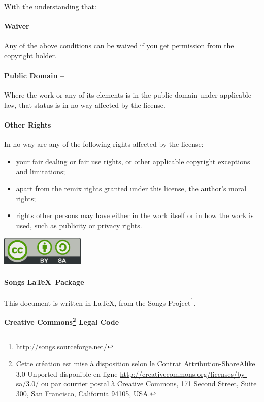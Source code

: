 {\begin{lblock}{With the understanding that:}
    \hspace{0.4cm}
    \parbox{15cm}{
      \paragraph{Waiver --}
      Any of the above conditions can be waived if you get permission
      from the copyright holder.

      \paragraph{Public Domain --}
      Where the work or any of its elements is in the public domain
      under applicable law, that status is in no way affected by the
      license.

      \paragraph{Other Rights --}
      In no way are any of the following rights affected by the license:
      \begin{itemize}
      \item your fair dealing or fair use rights, or other applicable
        copyright exceptions and limitations;
      \item apart from the remix rights granted under this license,
        the author's moral rights;
      \item rights other persons may have either in the work itself
        or in how the work is used, such as publicity or privacy rights.
      \end{itemize}
    }

    \begin{center}
      \includegraphics[width=4cm]{license}
    \end{center}

  \end{lblock}
  \paragraph{Songs \LaTeX~Package}
  This document is written in \LaTeX, from the Songs
  Project\footnote{\url{http://songs.sourceforge.net/}}.
}{
  \begin{center}
    \textbf{\LARGE{Creative Commons\footnote{ Cette création est mise à
          disposition selon le Contrat Attribution-ShareAlike 3.0
          Unported disponible en ligne
          \url{http://creativecommons.org/licenses/by-sa/3.0/} ou par
          courrier postal à Creative Commons, 171 Second Street, Suite
          300, San Francisco, California 94105, USA.} Legal Code} }
  \end{center}
  \vspace{1cm}

}

